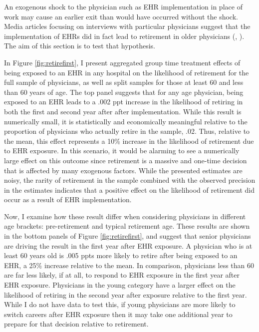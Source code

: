 \documentclass[11pt]{article}
\begin{document}
An exogenous shock to the physician such as EHR implementation in place of work may cause an earlier exit than would have occurred without the shock. Media articles focusing on interviews with particular physicians suggest that the implementation of EHRs did in fact lead to retirement in older physicians (\cite{ringel_2019}, \cite{loria_2020}). The aim of this section is to test that hypothesis.

In Figure \ref{fig:retirefirst}, I present aggregated group time treatment effects of being exposed to an EHR in any hospital on the likelihood of retirement for the full sample of physicians, as well as split samples for those at least 60 and less than 60 years of age. The top panel suggests that for any age physician, being exposed to an EHR leads to a .002 ppt increase in the likelihood of retiring in both the first and second year after after implementation. While this result is numerically small, it is statistically and economically meaningful relative to the proportion of physicians who actually retire in the sample, .02. Thus, relative to the mean, this effect represents a 10\% increase in the likelihood of retirement due to EHR exposure. In this scenario, it would be alarming to see a numerically large effect on this outcome since retirement is a massive and one-time decision that is affected by many exogenous factors. While the presented estimates are noisy, the rarity of retirement in the sample combined with the observed precision in the estimates indicates that a positive effect on the likelihood of retirement did occur as a result of EHR implementation.


Now, I examine how these result differ when considering physicians in different age brackets: pre-retirement and typical retirement age. These results are shown in the bottom panels of Figure \ref{fig:retirefirst}, and suggest that senior physicians are driving the result in the first year after EHR exposure. A physician who is at least 60 years old is .005 ppts more likely to retire after being exposed to an EHR, a 25\% increase relative to the mean. In comparison, physicians less than 60 are far less likely, if at all, to respond to EHR exposure in the first year after EHR exposure. Physicians in the young category have a larger effect on the likelihood of retiring in the second year after exposure relative to the first year. While I do not have data to test this, if young physicians are more likely to switch careers after EHR exposure then it may take one additional year to prepare for that decision relative to retirement.   
\end{document}
